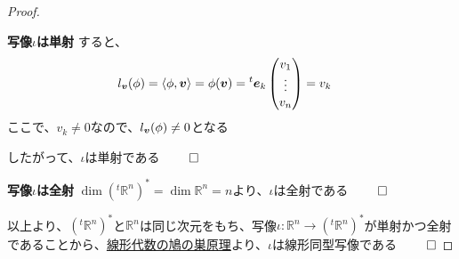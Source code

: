 \documentclass[../../../topic_linear-algebra]{subfiles}
\begin{document}
\begin{proof}
\begin{subpattern}{\bfseries 写像$\iota$は単射}
    すると、
    \begin{align*}
      l_{\vb*{v}}(\phi) & = \langle \phi, \vb*{v} \rangle = \phi(\vb*{v}) = {}^t\vb*{e}_k \begin{pmatrix}
                                                                                            v_1    \\
                                                                                            \vdots \\
                                                                                            v_n
                                                                                          \end{pmatrix} = v_k
    \end{align*}
    ここで、$v_k \neq 0$なので、$l_{\vb*{v}}(\phi) \neq 0$となる

    したがって、$\iota$は単射である $\qed$
  \end{subpattern}

  \begin{subpattern}{\bfseries 写像$\iota$は全射}
    $\dim({}^t\mathbb{R}^n)^* = \dim \mathbb{R}^n = n$より、$\iota$は全射である $\qed$
  \end{subpattern}

  以上より、$({}^t\mathbb{R}^n)^*$と$\mathbb{R}^n$は同じ次元をもち、写像$\iota\colon \mathbb{R}^n \to ({}^t\mathbb{R}^n)^*$が単射かつ全射であることから、\hyperref[thm:abstract-linear-pigeonhole]{線形代数の鳩の巣原理}より、$\iota$は線形同型写像である $\qed$
\end{proof}
\end{document}
